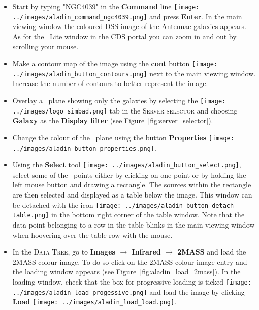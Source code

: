 \documentclass [a4paper, 12pt]{article}
\begin{document}
\begin{itemize}
    \item Start by typing "NGC4039" in the \textbf{Command} line
\texttt{[image: ../images/aladin\_command\_ngc4039.png]}
and press \textbf{Enter}. In the main viewing window the coloured DSS image of
the Antennae galaxies appears. As for the \aladin\ Lite window in the CDS
portal you can zoom in and out by scrolling your mouse.

    \item Make a contour map of the image using the \textbf{cont} button
\texttt{[image: ../images/aladin\_button\_contours.png]}
next to the main viewing window. Increase the number of contours to better
represent the image.

    \item Overlay a \simbad\ plane showing only the galaxies by selecting
the \texttt{[image: ../images/logo\_simbad.png]} tab
in the \textsc{Server selector} and choosing \textbf{Galaxy} as the \textbf{Display
filter} (see Figure~\ref{fig:server_selector}).

    \item Change the colour of the \simbad\ plane using the button
\textbf{Properties}
\texttt{[image: ../images/aladin\_button\_properties.png]}.


    \item Using the \textbf{Select} tool \texttt{[image: ../images/aladin\_button\_select.png]}, select some of the \simbad\
points either by clicking on one point or by holding the left mouse button and
drawing a rectangle. The sources within the rectangle are then selected and
displayed as a table below the image. This window can be detached with the icon
\texttt{[image: ../images/aladin\_button\_detach-table.png]} in the bottom right
corner of the table window. Note that the data point
belonging to a row in the table blinks in the main viewing window when
hoovering over the table row with the mouse.

    \item In the \textsc{Data Tree}, go to \textbf{Images $\rightarrow$
Infrared $\rightarrow$ 2MASS} and load the 2MASS colour image. To do so click on
the 2MASS colour image entry and the loading window appears (see
Figure~\ref{fig:aladin_load_2mass}). In the loading window, check that the box
for progressive loading is ticked \texttt{[image: ../images/aladin\_load\_progessive.png]} and load the image by
clicking \textbf{Load} \texttt{[image: ../images/aladin\_load\_load.png]}.


\end{itemize}
\end{document}
